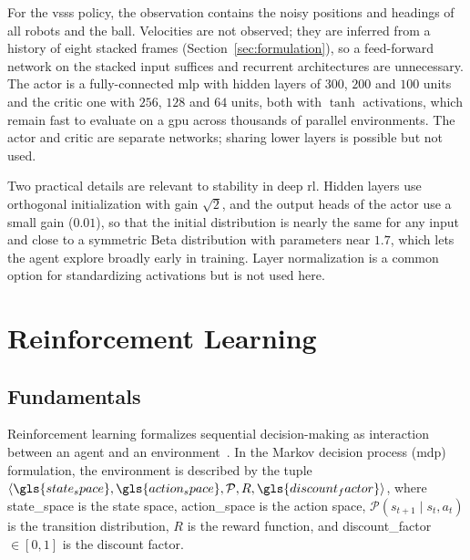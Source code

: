 For the \gls{vsss} policy, the observation contains the noisy positions and
headings of all robots and the ball.  Velocities are not observed; they are inferred from a history of eight stacked frames (Section~\ref{sec:formulation}), so a feed-forward network on the
stacked input suffices and recurrent architectures are unnecessary.  The actor is a fully-connected
\gls{mlp} with hidden layers of $300$, $200$ and $100$ units and the critic one with $256$, $128$ and $64$ units, both with $\tanh$ activations, which remain fast to evaluate on a \gls{gpu} across thousands
of parallel environments.  The actor and critic are separate networks; sharing lower layers is possible but not used.

Two practical details are relevant to stability in deep \gls{rl}.  Hidden layers use orthogonal initialization with gain $\sqrt{2}$, and the output heads of the actor use a small gain ($0.01$), so that the initial
distribution is nearly the same for any input and close to a symmetric Beta distribution with parameters near $1.7$, which lets the agent explore broadly early in training.  Layer normalization
is a common option for standardizing activations but is not used here.

\section{Reinforcement Learning}
\label{sec:rl}

\subsection{Fundamentals}

Reinforcement learning formalizes sequential decision-making as interaction
between an agent and an environment~\cite{sutton2018reinforcement}.  In the
Markov decision process (\acrshort{mdp}) formulation, the environment is described
by the tuple $\langle \gls{state_space}, \gls{action_space}, \mathcal{P}, R, \gls{discount_factor}
\rangle$, where \gls{state_space} is the state space, \gls{action_space} is the action
space, $\mathcal{P}(s_{t+1} \mid s_t, a_t)$ is the transition distribution,
$R$ is the reward function, and \gls{discount_factor} $\in [0,1]$ is the discount factor.

